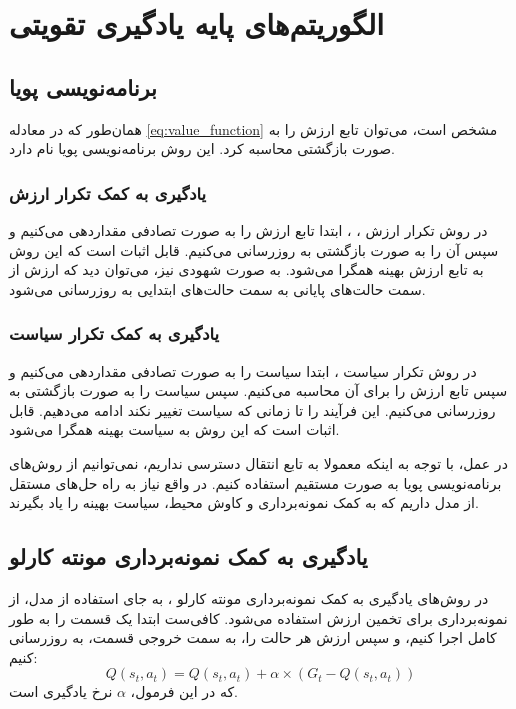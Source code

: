 \section{الگوریتم‌های پایه یادگیری تقویتی}
\subsection{برنامه‌نویسی پویا}
همان‌طور که در معادله \ref{eq:value_function} مشخص است، می‌توان تابع ارزش را به صورت بازگشتی محاسبه کرد.
این روش برنامه‌نویسی پویا 
نام دارد.
\subsubsection{یادگیری به کمک تکرار ارزش}
در روش تکرار ارزش ،
، ابتدا تابع ارزش را به صورت تصادفی مقداردهی می‌کنیم و سپس آن را به صورت بازگشتی به روزرسانی می‌کنیم.
قابل اثبات است که این روش به تابع ارزش بهینه همگرا می‌شود.
به صورت شهودی نیز، می‌توان دید که ارزش از سمت حالت‌های پایانی به سمت حالت‌های ابتدایی به روزرسانی می‌شود.
\subsubsection{یادگیری به کمک تکرار سیاست}
در روش تکرار سیاست ،
ابتدا سیاست را به صورت تصادفی مقداردهی می‌کنیم و سپس تابع ارزش را برای آن محاسبه می‌کنیم.
سپس سیاست را به صورت بازگشتی به روزرسانی می‌کنیم. 
این فرآیند را تا زمانی که سیاست تغییر نکند ادامه می‌دهیم.
قابل اثبات است که این روش به سیاست بهینه همگرا می‌شود.

در عمل، با توجه به اینکه معمولا به تابع انتقال دسترسی نداریم، نمی‌توانیم از روش‌های برنامه‌نویسی پویا به صورت مستقیم استفاده کنیم.
در واقع نیاز به راه حل‌های مستقل از مدل داریم که به کمک نمونه‌برداری و کاوش محیط، سیاست بهینه را یاد بگیرند.

\subsection{یادگیری به کمک نمونه‌برداری مونته کارلو}
در روش‌های یادگیری به کمک نمونه‌برداری مونته کارلو ،
به جای استفاده از مدل، از نمونه‌برداری برای تخمین ارزش استفاده می‌شود.
کافی‌ست ابتدا یک قسمت را به طور کامل اجرا کنیم، و سپس ارزش هر حالت را، به سمت خروجی قسمت، به روزرسانی کنیم:
\begin{equation}\label{eq:mc_q_function}
    Q(s_t, a_t) = Q(s_t, a_t) + \alpha \times (G_t - Q(s_t, a_t))
\end{equation}
که در این فرمول، $\alpha$
نرخ یادگیری  است.

